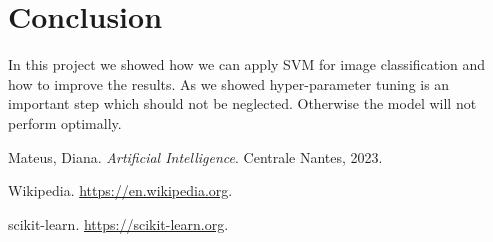 \documentclass{thesisreport}
\begin{document}

\newpage

 \chapter*{Conclusion}
 
 
In this project we showed how we can apply SVM for image classification and how to improve the results. As we showed hyper-parameter tuning is an important step which should not be neglected. Otherwise the model will not perform optimally.  
 
 

 \begin{thebibliography}{9}
    Mateus, Diana.
    \emph{Artificial Intelligence}.
    Centrale Nantes, 2023.

    Wikipedia.
    \url{https://en.wikipedia.org}.

    scikit-learn.
    \url{https://scikit-learn.org}.
\end{thebibliography}
 
 
\end{document}
